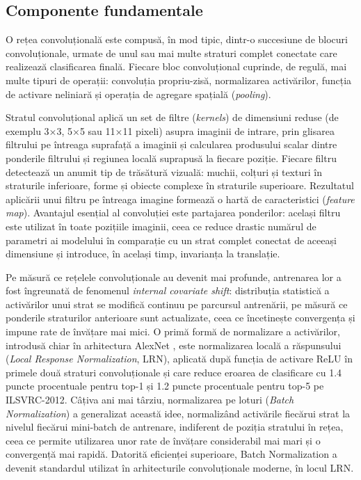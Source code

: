 \subsection{Componente fundamentale}

O rețea convoluțională este compusă, în mod tipic, dintr-o succesiune de blocuri convoluționale, urmate de unul sau mai multe straturi complet conectate care realizează clasificarea finală. Fiecare bloc convoluțional cuprinde, de regulă, mai multe tipuri de operații: convoluția propriu-zisă, normalizarea activărilor, funcția de activare neliniară și operația de agregare spațială (\textit{pooling}).

Stratul convoluțional aplică un set de filtre (\textit{kernels}) de dimensiuni reduse (de exemplu 3×3, 5×5 sau 11×11 pixeli) asupra imaginii de intrare, prin glisarea filtrului pe întreaga suprafață a imaginii și calcularea produsului scalar dintre ponderile filtrului și regiunea locală suprapusă la fiecare poziție. Fiecare filtru detectează un anumit tip de trăsătură vizuală: muchii, colțuri și texturi în straturile inferioare, forme și obiecte complexe în straturile superioare. Rezultatul aplicării unui filtru pe întreaga imagine formează o hartă de caracteristici (\textit{feature map}). Avantajul esențial al convoluției este partajarea ponderilor: același filtru este utilizat în toate pozițiile imaginii, ceea ce reduce drastic numărul de parametri ai modelului în comparație cu un strat complet conectat de aceeași dimensiune și introduce, în același timp, invarianța la translație.

Pe măsură ce rețelele convoluționale au devenit mai profunde, antrenarea lor a fost îngreunată de fenomenul \textit{internal covariate shift}: distribuția statistică a activărilor unui strat se modifică continuu pe parcursul antrenării, pe măsură ce ponderile straturilor anterioare sunt actualizate, ceea ce încetinește convergența și impune rate de învățare mai mici. O primă formă de normalizare a activărilor, introdusă chiar în arhitectura AlexNet \cite{krizhevsky2012imagenet}, este normalizarea locală a răspunsului (\textit{Local Response Normalization}, LRN), aplicată după funcția de activare ReLU în primele două straturi convoluționale și care reduce eroarea de clasificare cu 1.4 puncte procentuale pentru top-1 și 1.2 puncte procentuale pentru top-5 pe ILSVRC-2012. Câțiva ani mai târziu, normalizarea pe loturi (\textit{Batch Normalization}) \cite{ioffe2015batchnorm} a generalizat această idee, normalizând activările fiecărui strat la nivelul fiecărui mini-batch de antrenare, indiferent de poziția stratului în rețea, ceea ce permite utilizarea unor rate de învățare considerabil mai mari și o convergență mai rapidă. Datorită eficienței superioare, Batch Normalization a devenit standardul utilizat în arhitecturile convoluționale moderne, în locul LRN.

